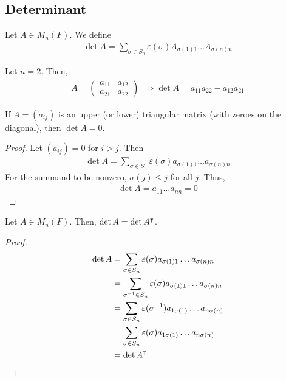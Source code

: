 \subsection{Determinant}
\begin{definition}
	Let $A \in M_n(F)$.
	We define
	\begin{align*}
		\det A = \sum_{\sigma \in S_n} \varepsilon(\sigma) A_{\sigma(1) 1} \dots A_{\sigma(n) n}
	\end{align*}
\end{definition}
\begin{example}
	Let $n = 2$.
	Then,
	\begin{align*}
		A = \begin{pmatrix} a_{11} & a_{12} \\ a_{21} & a_{22} \end{pmatrix} \implies \det A = a_{11} a_{22} - a_{12} a_{21}
	\end{align*}
\end{example}
\begin{lemma}
	If $A = (a_{ij})$ is an upper (or lower) triangular matrix (with zeroes on the diagonal), then $\det A = 0$.
\end{lemma}
\begin{proof}
	Let $(a_{ij}) = 0$ for $i > j$.
	Then
	\begin{align*}
		\det A = \sum_{\sigma \in S_n} \varepsilon(\sigma) a_{\sigma(1) 1} \dots a_{\sigma(n) n}
	\end{align*}
	For the summand to be nonzero, $\sigma(j) \leq j$ for all $j$.
	Thus,
	\begin{align*}
		\det A = a_{1 1} \dots a_{n n} = 0
	\end{align*}
\end{proof}
\begin{lemma}
	Let $A \in M_n(F)$.
	Then, $\det A = \det A^\intercal$.
\end{lemma}
\begin{proof}
	\begin{align*}
		\det A & = \sum_{\sigma \in S_n} \varepsilon(\sigma) a_{\sigma(1) 1} \dots a_{\sigma(n) n}      \\
		       & = \sum_{\sigma^{-1} \in S_n} \varepsilon(\sigma) a_{\sigma(1) 1} \dots a_{\sigma(n) n} \\
		       & = \sum_{\sigma \in S_n} \varepsilon(\sigma^{-1}) a_{1 \sigma(1)} \dots a_{n \sigma(n)} \\
		       & = \sum_{\sigma \in S_n} \varepsilon(\sigma) a_{1 \sigma(1)} \dots a_{n \sigma(n)}      \\
		       & = \det A^\intercal
	\end{align*}
\end{proof}

